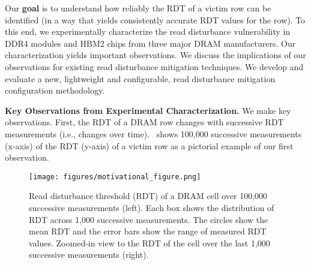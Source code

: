 


Our \textbf{goal} is to understand how reliably the RDT of a 
victim row can be identified (in a way that yields consistently 
accurate RDT values for the row). To this end, we experimentally 
characterize the read disturbance vulnerability in  DDR4 modules and  HBM2
chips from three major DRAM manufacturers. Our characterization yields  important observations. 
We discuss the implications of our observations for existing read disturbance mitigation techniques. 
We develop and evaluate a new, lightweight and configurable, read disturbance mitigation 
configuration methodology.



\noindent
\textbf{Key Observations from Experimental Characterization.} We make  key observations. 
First, the RDT of a DRAM row changes with successive RDT measurements (i.e., changes over 
time).~ shows 100,000 successive measurements (x-axis) of the RDT (y-axis) 
of a victim row as a pictorial example of our first observation.

\begin{figure}[!ht]
    \centering
    \texttt{[image: figures/motivational\_figure.png]}
    \caption{Read disturbance threshold (RDT) of a DRAM cell over 
    100,000 successive measurements (left). 
    Each box shows the distribution of RDT across 1,000 successive measurements. 
    The circles show the mean RDT and the error bars show the range of 
    measured RDT values. Zoomed-in view to the RDT of the cell over the 
    last 1,000 successive measurements (right).}
    \label{fig:motivation_example}
\end{figure}


